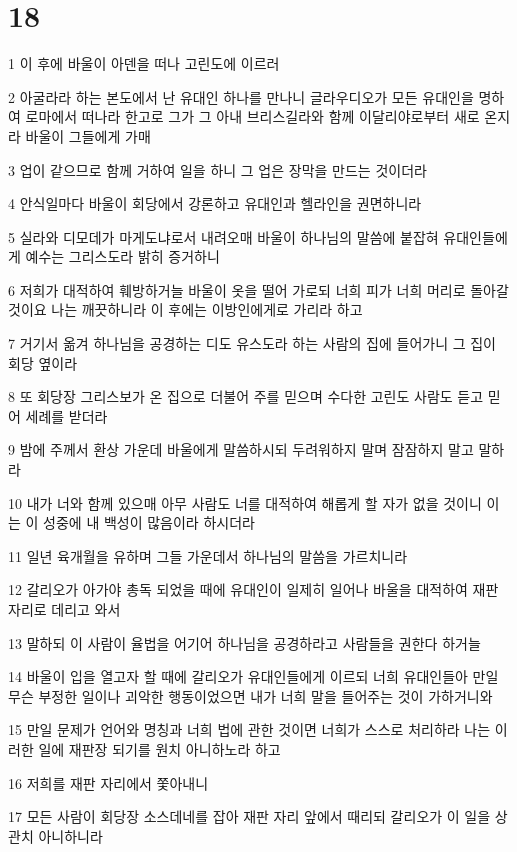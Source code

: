 \chapter{18}

\par 1 이 후에 바울이 아덴을 떠나 고린도에 이르러
\par 2 아굴라라 하는 본도에서 난 유대인 하나를 만나니 글라우디오가 모든 유대인을 명하여 로마에서 떠나라 한고로 그가 그 아내 브리스길라와 함께 이달리야로부터 새로 온지라 바울이 그들에게 가매
\par 3 업이 같으므로 함께 거하여 일을 하니 그 업은 장막을 만드는 것이더라
\par 4 안식일마다 바울이 회당에서 강론하고 유대인과 헬라인을 권면하니라
\par 5 실라와 디모데가 마게도냐로서 내려오매 바울이 하나님의 말씀에 붙잡혀 유대인들에게 예수는 그리스도라 밝히 증거하니
\par 6 저희가 대적하여 훼방하거늘 바울이 옷을 떨어 가로되 너희 피가 너희 머리로 돌아갈 것이요 나는 깨끗하니라 이 후에는 이방인에게로 가리라 하고
\par 7 거기서 옮겨 하나님을 공경하는 디도 유스도라 하는 사람의 집에 들어가니 그 집이 회당 옆이라
\par 8 또 회당장 그리스보가 온 집으로 더불어 주를 믿으며 수다한 고린도 사람도 듣고 믿어 세례를 받더라
\par 9 밤에 주께서 환상 가운데 바울에게 말씀하시되 두려워하지 말며 잠잠하지 말고 말하라
\par 10 내가 너와 함께 있으매 아무 사람도 너를 대적하여 해롭게 할 자가 없을 것이니 이는 이 성중에 내 백성이 많음이라 하시더라
\par 11 일년 육개월을 유하며 그들 가운데서 하나님의 말씀을 가르치니라
\par 12 갈리오가 아가야 총독 되었을 때에 유대인이 일제히 일어나 바울을 대적하여 재판 자리로 데리고 와서
\par 13 말하되 이 사람이 율법을 어기어 하나님을 공경하라고 사람들을 권한다 하거늘
\par 14 바울이 입을 열고자 할 때에 갈리오가 유대인들에게 이르되 너희 유대인들아 만일 무슨 부정한 일이나 괴악한 행동이었으면 내가 너희 말을 들어주는 것이 가하거니와
\par 15 만일 문제가 언어와 명칭과 너희 법에 관한 것이면 너희가 스스로 처리하라 나는 이러한 일에 재판장 되기를 원치 아니하노라 하고
\par 16 저희를 재판 자리에서 쫓아내니
\par 17 모든 사람이 회당장 소스데네를 잡아 재판 자리 앞에서 때리되 갈리오가 이 일을 상관치 아니하니라
